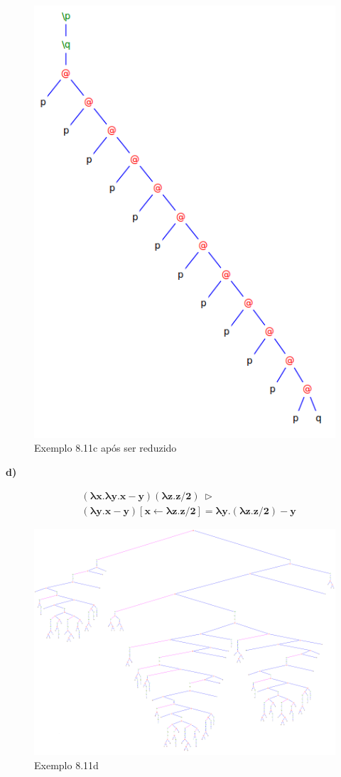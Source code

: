\documentclass[a4paper]{article}
\begin{document}
\begin{figure}[h]
  \centering
  \includegraphics[scale=0.35]{8-11c_2.png}
  \caption{Exemplo 8.11c após ser reduzido}
\end{figure}


\FloatBarrier

\textbf{d)}

\begin{align*}
&\mathbf{(\lambda x.\lambda y.x - y) (\lambda z.z / 2) \ \rhd} \\
&\mathbf{(\lambda y.x - y) [x \leftarrow \lambda z.z / 2] = \lambda y.(\lambda z.z /2) - y}
\end{align*}

\begin{figure}[h]
  \centering
  \includegraphics[scale=0.3]{8-11d_1.png}
  \caption{Exemplo 8.11d}
\end{figure}
\end{document}
